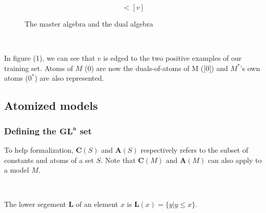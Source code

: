 \documentclass[a4paper, 11pt]{article}
\begin{document}
\begin{equation}
     [T_1^+] < [v]
\end{equation}

\begin{figure}%
    \centering
    \qquad
    \caption{The master algebra and the dual algebra}%
    \label{fig:example}%
\end{figure}

\

In figure (1), we can see that $v$ is edged to the two positive examples of our training set. Atoms of $M$ ($0$) are now the duals-of-atoms of M ([$0$]) and $M^{\ast}$'s own atoms ($0^{\ast}$) are also represented.

\subsection{Atomized models}

\subsubsection{Defining the $\boldsymbol{GL}^{\boldsymbol{a}}$ set}

To help formalization, $\boldsymbol{C}(S)$ and $\boldsymbol{A}(S)$ respectively refers to the subset of constants and atoms of a set $S$. Note that $\boldsymbol{C}(M)$ and $\boldsymbol{A}(M)$ can also apply to a model $M$.

\

The lower segement $\boldsymbol{L}$ of an element $x$ is $\boldsymbol{L}(x) = \{y | y \leq x\}$.

\
\end{document}
